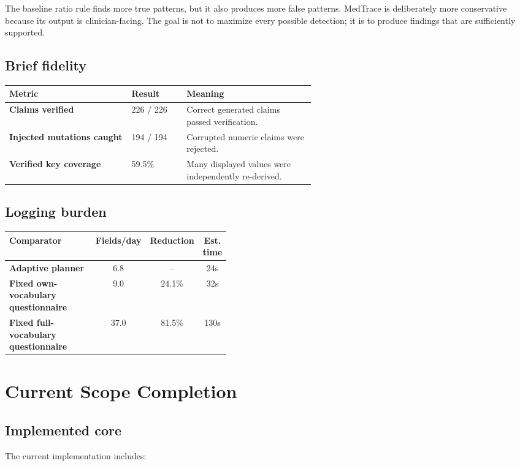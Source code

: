 \documentclass[11pt,a4paper]{article}
\begin{document}
The baseline ratio rule finds more true patterns, but it also produces more false patterns. MedTrace is deliberately more conservative because its output is clinician-facing. The goal is not to maximize every possible detection; it is to produce findings that are sufficiently supported.

\subsection{Brief fidelity}

\begin{tabularx}{\linewidth}{>{\bfseries}p{0.40\linewidth}p{0.18\linewidth}X}
\toprule
Metric & Result & Meaning \\
\midrule
Claims verified & 226 / 226 & Correct generated claims passed verification. \\
Injected mutations caught & 194 / 194 & Corrupted numeric claims were rejected. \\
Verified key coverage & 59.5\% & Many displayed values were independently re-derived. \\
\bottomrule
\end{tabularx}

\subsection{Logging burden}

\begin{tabularx}{\linewidth}{>{\bfseries}p{0.42\linewidth}ccc}
\toprule
Comparator & Fields/day & Reduction & Est. time \\
\midrule
Adaptive planner & 6.8 & -- & 24s \\
Fixed own-vocabulary questionnaire & 9.0 & 24.1\% & 32s \\
Fixed full-vocabulary questionnaire & 37.0 & 81.5\% & 130s \\
\bottomrule
\end{tabularx}

\section{Current Scope Completion}

\subsection{Implemented core}

The current implementation includes:
\end{document}
